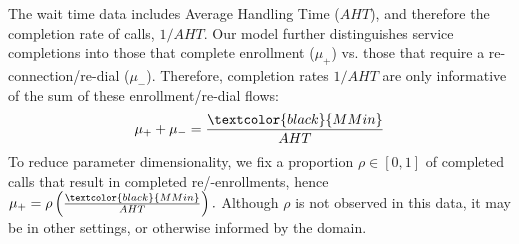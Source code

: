 \documentclass[manuscript,screen,authorversion]{acmart}
\newcommand{\rev}[1]{\textcolor{black}{#1}}
\begin{document}
The wait time data includes Average Handling Time ($AHT$), 
and therefore the completion rate of calls, $1/AHT$. Our model further distinguishes service completions into those that complete enrollment ($\mu_{\mathsf{+}}$) vs. those that require a re-connection/re-dial ($\mu_{\mathsf{-}}$). Therefore, completion rates $1/AHT$ are only informative of the sum of these enrollment/re-dial flows:
    $$
  \mu_{\mathsf{+}} + \mu_{\mathsf{-}} = \frac{\rev{MMin}}{AHT} $$
  To reduce parameter dimensionality, we fix a proportion $\rho\in[0,1]$ of completed calls that result in completed re/-enrollments, hence $\mu_{\mathsf{+}} = \rho \left( \frac{\rev{MMin}}{AHT} \right).$ Although $\rho$ is not observed in this data, it may be in other settings, or otherwise informed by the domain. 



    
    
\end{document}
